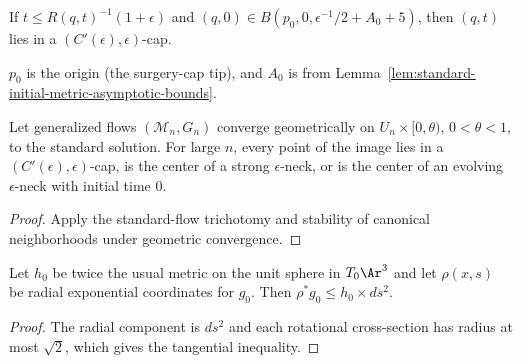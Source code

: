 \begin{corollary}
\label{cor:standard-solution-cap-near-tip}
\label{stdsolncap}
If $t\le R(q,t)^{-1}(1+\epsilon)$ and
$(q,0)\in B(p_0,0,\epsilon^{-1}/2+A_0+5)$, then $(q,t)$ lies in a
$(C'(\epsilon),\epsilon)$-cap.
\end{corollary}

\begin{remark}
\label{rem:tip-and-a0-definitions}
$p_0$ is the origin (the surgery-cap tip), and $A_0$ is from
Lemma~\ref{lem:standard-initial-metric-asymptotic-bounds}.
\end{remark}

\begin{corollary}
\label{cor:generalized-flow-limit-trichotomy}
\label{stdsolnlimit}
Let generalized flows $({\mathcal M}_n,G_n)$ converge geometrically on
$U_n\times[0,\theta)$, $0<\theta<1$, to the standard solution. For large
$n$, every point of the image lies in a $(C'(\epsilon),\epsilon)$-cap,
is the center of a strong $\epsilon$-neck, or is the center of an evolving
$\epsilon$-neck with initial time $0$.
\end{corollary}
\begin{proof}
\sketch Apply the standard-flow trichotomy and stability of canonical
neighborhoods under geometric convergence.
\end{proof}

\begin{lemma}
\label{lem:standard-initial-metric-distance-decreasing}
\label{decrease}
Let $h_0$ be twice the usual metric on the unit sphere in $T_0\Ar^3$ and
let $\rho(x,s)$ be radial exponential coordinates for $g_0$. Then
$\rho^*g_0\le h_0\times ds^2$.
\end{lemma}
\begin{proof}
\sketch The radial component is $ds^2$ and each rotational cross-section
has radius at most $\sqrt2$, which gives the tangential inequality.
\end{proof}
